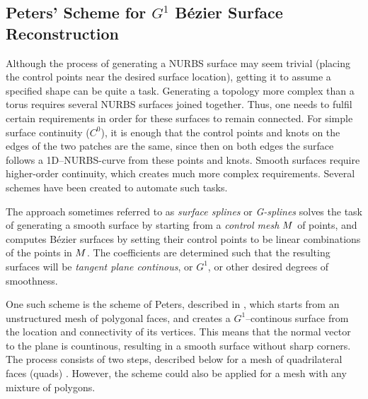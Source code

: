\subsection{Peters' Scheme for $G^1$ B{\'e}zier Surface Reconstruction}
\label{subsec:peters}
Although the process of generating a NURBS surface may seem trivial (placing the control points near the desired surface location), getting it to assume a specified shape can be quite a task. Generating a topology more complex than a torus  requires several NURBS surfaces joined together. Thus, one needs to fulfil certain requirements in order for these surfaces to remain connected. For simple surface continuity ($C^0$), it is enough that the control points and knots on the edges of the two patches are the same, since then on both edges the surface follows a 1D--NURBS-curve from these points and knots. Smooth surfaces require higher-order continuity, which creates much more complex requirements. Several schemes have been created to automate such tasks.

The approach sometimes referred to as \emph{surface splines} or \emph{G-splines} \cite{eck1996automatic} solves the task of generating a smooth surface by starting from a \emph{control mesh} $\petersControlMesh$ of points, and computes B{\'e}zier surfaces by setting their control points to be linear combinations of the points in $\petersControlMesh$. The coefficients are determined such that the resulting surfaces will be \emph{tangent plane continous}, or $G^1$, or other desired degrees of smoothness.

One such scheme is the scheme of Peters, described in \cite{peters1992constructing}, which starts from an unstructured mesh of polygonal faces, and creates a $G^1$--continous surface from the location and connectivity of its vertices. This means that the normal vector to the plane is countinous, resulting in a smooth surface without sharp corners. The process consists of two steps, described below for a mesh of quadrilateral faces (quads) \cite{eck1996automatic}. However, the scheme could also be applied for a mesh with any mixture of polygons.

